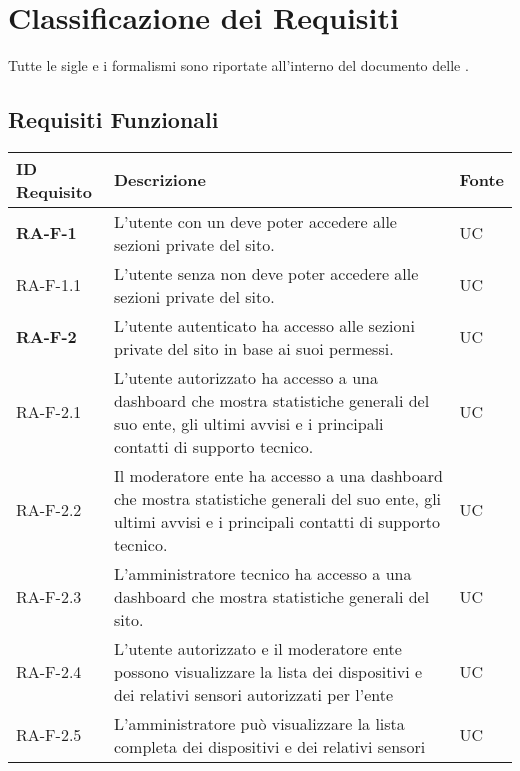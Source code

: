 \section{Classificazione dei Requisiti}

Tutte le sigle e i formalismi sono riportate all'interno del documento delle .

	\subsection{Requisiti Funzionali}


	\begin{center}
		\begin{longtable}{|p{3cm}|p{10cm}|p{2cm}|}
		\hline
		\rowcolor{lighter-grayer}
		\textbf{ID Requisito} & \textbf{Descrizione} & \textbf{Fonte} \\
		\hline
		\endfirsthead

		\rowcolor{redroundrobin}
		\textbf{RA-F-1} & L'utente con un \glock{account valido} deve poter accedere alle sezioni private del sito. & UC \\ \hline
		{\color{gray} RA-F-}1.1 & L'utente senza \glock{account valido} non deve poter accedere alle sezioni private del sito. & UC \\ \hline
		
		\rowcolor{redroundrobin}
		\textbf{RA-F-2} & L'utente autenticato ha accesso alle sezioni private del sito in base ai suoi permessi. & UC \\ \hline 
		
		{\color{gray} RA-F-}2.1 & L'utente autorizzato ha accesso a una dashboard che mostra statistiche generali del suo ente, gli ultimi avvisi e i principali contatti di supporto tecnico. & UC \\ \hline
		{\color{gray} RA-F-}2.2 & Il moderatore ente ha accesso a una dashboard che mostra statistiche generali del suo ente, gli ultimi avvisi e i principali contatti di supporto tecnico. & UC \\ \hline
		{\color{gray} RA-F-}2.3 & L'amministratore tecnico ha accesso a una dashboard che mostra statistiche generali del sito. & UC \\ \hline
		
		{\color{gray} RA-F-}2.4 & L'utente autorizzato e il moderatore ente possono visualizzare la lista dei dispositivi e dei relativi sensori autorizzati per l'ente & UC \\ \hline
		{\color{gray} RA-F-}2.5 & L'amministratore può visualizzare la lista completa dei dispositivi e dei relativi sensori & UC \\ \hline


\end{longtable}
\end{center}
